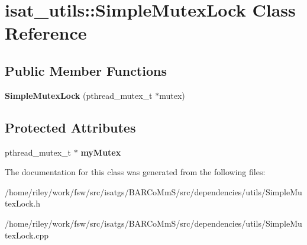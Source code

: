 \hypertarget{classisat__utils_1_1_simple_mutex_lock}{}\section{isat\+\_\+utils\+:\+:Simple\+Mutex\+Lock Class Reference}
\label{classisat__utils_1_1_simple_mutex_lock}
\subsection*{Public Member Functions}
\begin{DoxyCompactItemize}
\item 
{\bfseries Simple\+Mutex\+Lock} (pthread\+\_\+mutex\+\_\+t $\ast$mutex)\hypertarget{classisat__utils_1_1_simple_mutex_lock_a7590d3ad64870694d9b5cb0396d00568}{}\label{classisat__utils_1_1_simple_mutex_lock_a7590d3ad64870694d9b5cb0396d00568}

\end{DoxyCompactItemize}
\subsection*{Protected Attributes}
\begin{DoxyCompactItemize}
\item 
pthread\+\_\+mutex\+\_\+t $\ast$ {\bfseries my\+Mutex}\hypertarget{classisat__utils_1_1_simple_mutex_lock_a12360895886a2dc13d015e7eeb978c29}{}\label{classisat__utils_1_1_simple_mutex_lock_a12360895886a2dc13d015e7eeb978c29}

\end{DoxyCompactItemize}


The documentation for this class was generated from the following files\+:\begin{DoxyCompactItemize}
\item 
/home/riley/work/fsw/src/isatgs/\+B\+A\+R\+Co\+Mm\+S/src/dependencies/utils/Simple\+Mutex\+Lock.\+h\item 
/home/riley/work/fsw/src/isatgs/\+B\+A\+R\+Co\+Mm\+S/src/dependencies/utils/Simple\+Mutex\+Lock.\+cpp\end{DoxyCompactItemize}
